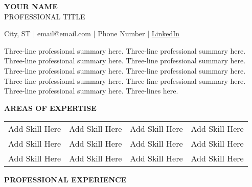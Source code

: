 \documentclass[11pt,letterpaper]{article}
\newcommand{\headertext}[1]{\begin{center}\textbf{\large #1}\end{center}}
\begin{document}

\begin{center}
    \Huge{\textbf{YOUR NAME}}\\[0.2cm]
    \large{PROFESSIONAL TITLE}\\[0.5cm]
\end{center}

\begin{center}
    City, ST \quad | \quad email@email.com \quad | \quad Phone Number \quad | \quad \href{https://linkedin.com}{LinkedIn}
\end{center}

\vspace{0.5cm}

\begin{small}
Three-line professional summary here. Three-line professional summary here. Three-line professional summary here. Three-line professional summary here. Three-line professional summary here. Three-line professional summary here. Three-line professional summary here. Three-line professional summary here. Three-line professional summary here. Three-lines here.
\end{small}

\vspace{0.5cm}

\headertext{AREAS OF EXPERTISE}

\begin{center}
\begin{tabular}{p{}p{}p{}p{}}
Add Skill Here & Add Skill Here & Add Skill Here & Add Skill Here \\
Add Skill Here & Add Skill Here & Add Skill Here & Add Skill Here \\
Add Skill Here & Add Skill Here & Add Skill Here & Add Skill Here \\
\end{tabular}
\end{center}

\vspace{0.5cm}

\headertext{PROFESSIONAL EXPERIENCE}

\vspace{0.2cm}
\end{document}
